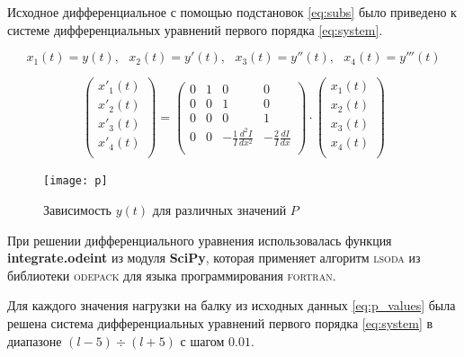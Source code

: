 Исходное дифференциальное с помощью подстановок \ref{eq:subs} было приведено к системе дифференциальных уравнений первого порядка \ref{eq:system}.

\begin{equation}\label{eq:subs}
x_1(t) = y(t),\ \ \ x_2(t) = y'(t),\ \ \ x_3(t) = y''(t),\ \ \ x_4(t) = y'''(t)
\end{equation}

\begin{equation}\label{eq:system}
\begin{pmatrix}
    x'_1(t) \\
    x'_2(t) \\
    x'_3(t) \\
    x'_4(t) \\
\end{pmatrix} =
\begin{pmatrix}
    0 & 1 & 0 & 0 \\
    0 & 0 & 1 & 0 \\
    0 & 0 & 0 & 1 \\
    0 & 0 & - \frac{1}{I} \frac{d^2I}{dx^2} & - \frac{2}{I} \frac{dI}{dx} \\
\end{pmatrix}
\cdot
\begin{pmatrix}
    x_1(t) \\
    x_2(t) \\
    x_3(t) \\
    x_4(t) \\
\end{pmatrix}
\end{equation}

\begin{figure}[H]
\begin{center}
	\vspace{-0.5cm}
	\texttt{[image: p]}
	\caption{Зависимость $y(t)$ для различных значений $P$}
	\label{plt:p}
	\vspace{-0.5cm}
\end{center}
\end{figure}

При решении дифференциального уравнения использовалась функция \textbf{integrate.odeint} из модуля \textbf{SciPy}, которая применяет алгоритм \textsc{lsoda} из библиотеки \textsc{odepack} для языка программирования \textsc{fortran}.

Для каждого значения нагрузки на балку из исходных данных \ref{eq:p_values} была решена система дифференциальных уравнений первого порядка \ref{eq:system} в диапазоне $(l-5) \div (l+5)$ с шагом $0.01$.


